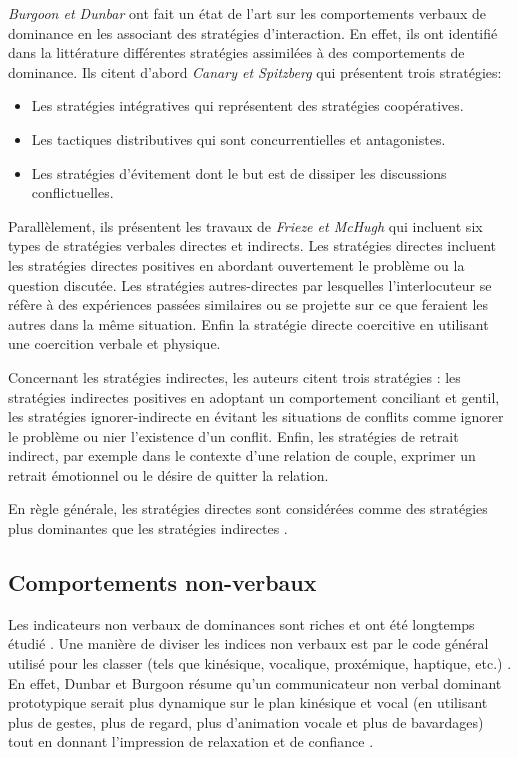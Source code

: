 			\emph{Burgoon et Dunbar} \cite{dunbar2005perceptions} ont fait un état de l'art sur les comportements verbaux de dominance en les associant des stratégies d'interaction. En effet, ils ont identifié dans la littérature différentes stratégies assimilées à des comportements de dominance. Ils citent d'abord \emph{Canary et Spitzberg} \cite{canary1987} qui présentent trois stratégies: 
			\begin{itemize}
				\item Les stratégies intégratives qui représentent des stratégies coopératives.
				\item Les tactiques distributives qui sont concurrentielles et antagonistes.
				\item Les stratégies d'évitement dont le but est de dissiper les discussions conflictuelles. 
			\end{itemize}
			
			Parallèlement, ils présentent les travaux de \emph{Frieze et McHugh} \cite{frieze1992power} qui incluent six types de stratégies verbales directes et indirects. 
			Les stratégies directes incluent les stratégies	directes positives en abordant ouvertement le problème ou la question discutée. Les stratégies autres-directes par lesquelles l'interlocuteur se réfère à des expériences passées similaires ou se projette sur ce que feraient les autres dans la même situation. Enfin la stratégie directe coercitive en utilisant une coercition verbale et physique. 
			
			Concernant les stratégies indirectes, les auteurs citent trois stratégies : les stratégies indirectes positives en adoptant un comportement conciliant et gentil, les stratégies ignorer-indirecte en évitant les situations de conflits comme ignorer le problème ou nier l'existence d'un conflit. Enfin, les stratégies de retrait indirect, par exemple dans le contexte d'une relation de couple, exprimer un retrait émotionnel ou le désire de quitter la relation. 
		
			En règle générale, les stratégies directes sont considérées comme des stratégies plus dominantes que les stratégies indirectes \cite{dunbar2005perceptions}.
			
		\subsection{Comportements non-verbaux}
			Les indicateurs non verbaux de dominances sont riches et ont été longtemps étudié \cite{burgoon1995interpersonal,burgoon1998nature}. Une manière de diviser les indices non verbaux est par le code général utilisé pour les classer (tels que kinésique, vocalique, proxémique, haptique, etc.) \cite{burgoon2006nonverbal}. En effet, Dunbar et Burgoon \cite{dunbar2005perceptions} résume qu'un communicateur non verbal dominant prototypique serait plus dynamique sur le plan kinésique et vocal (en utilisant plus de gestes, plus de regard, plus d'animation vocale et plus de bavardages) tout en donnant l'impression de relaxation et de confiance .
			

